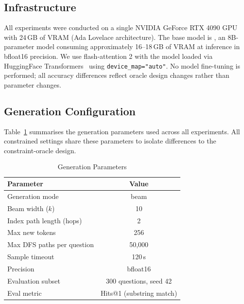 \subsection{Infrastructure}
\label{sec:ch4infra}

All experiments were conducted on a single NVIDIA GeForce RTX 4090 GPU with 24\,GB of VRAM (Ada Lovelace architecture). The base model is \modelname{}, an 8B-parameter model consuming approximately 16--18\,GB of VRAM at inference in bfloat16 precision. We use flash-attention 2 with the model loaded via HuggingFace Transformers~\citep{wolf2020transformers} using \texttt{device\_map="auto"}. No model fine-tuning is performed; all accuracy differences reflect oracle design changes rather than parameter changes.

\subsection{Generation Configuration}
\label{sec:ch4config}

Table~\ref{tab:gen_config} summarises the generation parameters used across all experiments. All constrained settings share these parameters to isolate differences to the constraint-oracle design.

\begin{table}[H]
  \centering
  \caption[Generation Configuration]{Generation Parameters}
  \label{tab:gen_config}
  \begin{tabularx}{\textwidth}{|X|c|}
    \hline
    \textbf{Parameter}            & \textbf{Value} \\
    \hline
    Generation mode               & beam           \\
    Beam width ($k$)              & 10             \\
    Index path length (hops)      & 2              \\
    Max new tokens                & 256            \\
    Max DFS paths per question    & 50,000         \\
    Sample timeout                & 120\,s         \\
    Precision                     & bfloat16       \\
    Evaluation subset             & 300 questions, seed 42 \\
    Eval metric                   & Hits@1 (substring match) \\
    \hline
  \end{tabularx}
\end{table}

